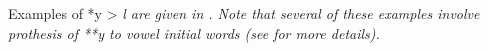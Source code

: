
Examples of *y > \it{l} are given in .
Note that several of these examples involve prothesis of **y
to vowel initial words (see  for more details).

